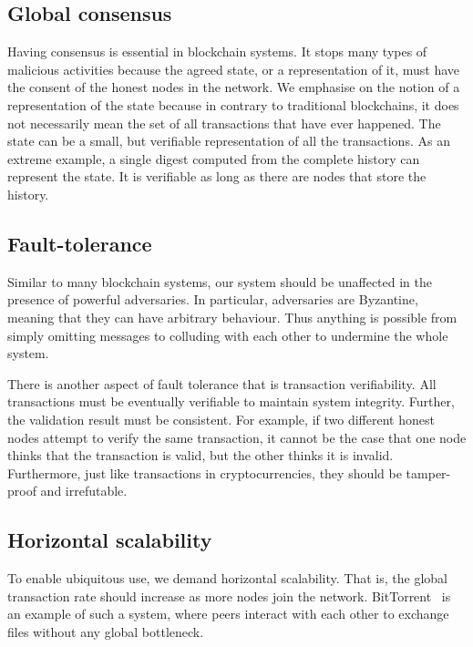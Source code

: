 \subsection*{Global consensus}
Having consensus is essential in blockchain systems.
It stops many types of malicious activities because the agreed state, or a representation of it, must have the consent of the honest nodes in the network.
We emphasise on the notion of a representation of the state because in contrary to traditional blockchains,
it does not necessarily mean the set of all transactions that have ever happened.
The state can be a small, but verifiable representation of all the transactions.
As an extreme example, a single digest computed from the complete history can represent the state.
It is verifiable as long as there are nodes that store the history.

\subsection*{Fault-tolerance}
Similar to many blockchain systems,
our system should be unaffected in the presence of powerful adversaries.
In particular, adversaries are Byzantine,
meaning that they can have arbitrary behaviour.
Thus anything is possible from simply omitting messages to colluding with each other to undermine the whole system.

There is another aspect of fault tolerance that is transaction verifiability.
All transactions must be eventually verifiable to maintain system integrity.
Further, the validation result must be consistent.
For example, if two different honest nodes attempt to verify the same transaction,
it cannot be the case that one node thinks that the transaction is valid, but the other thinks it is invalid.
Furthermore, just like transactions in cryptocurrencies, they should be tamper-proof and irrefutable.

\subsection*{Horizontal scalability}

To enable ubiquitous use, we demand horizontal scalability.
That is, the global transaction rate should increase as more nodes join the network.
BitTorrent~\cite{cohen2003incentives} is an example of such a system,
where peers interact with each other to exchange files without any global bottleneck.


